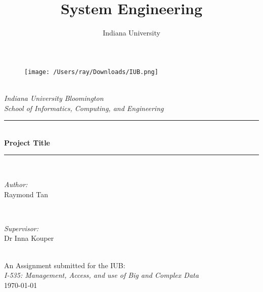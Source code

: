 \documentclass[
	12pt, %
]{fphw}
\author{Indiana University}
\begin{document}
\begin{titlepage}
\newcommand{\HRule}{\rule{\linewidth}{0.5mm}}

\begin{figure}
	\centering
         \texttt{[image: /Users/ray/Downloads/IUB.png]}\\[1cm] 
\end{figure}         

\center 
\quad\\[1.5cm]
\textsl{\Large Indiana University Bloomington}\\[0.5cm] 
\textsl{\large School of Informatics, Computing, and Engineering}\\[0.5cm] 

\makeatletter
\HRule \\[0.6cm]
{\huge \bfseries{Project Title}}\\[0.4cm] 
\HRule \\[1.5cm]

\begin{minipage}{0.4\textwidth}
\begin{flushleft} \large
\emph{Author:}\\
\textup{Raymond Tan}
\end{flushleft}
\end{minipage}
~
\begin{minipage}{0.4\textwidth}
\begin{flushright} \large
\emph{Supervisor:} \\
\textup{Dr Inna Kouper }
\end{flushright}
\end{minipage}\\[3cm]

\makeatother
{\large {An Assignment submitted for the IUB:}}\\[0.5cm]
{\large \emph{I-535: Management, Access, and use of Big and Complex Data}}\\[0.5cm]
{\large \today}\\[2cm] 

\vfill
\end{titlepage}


\title{System Engineering} %


\cleardoublepage
\end{document}
